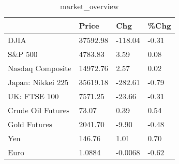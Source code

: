 \documentclass{article}%
\begin{document}
%


\begin{table}[htbp]%
\caption{market\_overview}%
\centering%
\begin{adjustbox}{width=1\textwidth}%
\begin{tabular}{llll}
\toprule
                  &    Price &     Chg &  \%Chg \\
\midrule
             DJIA & 37592.98 & -118.04 & -0.31 \\
          S\&P 500 &  4783.83 &    3.59 &  0.08 \\
 Nasdaq Composite & 14972.76 &    2.57 &  0.02 \\
Japan: Nikkei 225 & 35619.18 & -282.61 & -0.79 \\
     UK: FTSE 100 &  7571.25 &  -23.66 & -0.31 \\
Crude Oil Futures &    73.07 &    0.39 &  0.54 \\
     Gold Futures &  2041.70 &   -9.90 & -0.48 \\
              Yen &   146.76 &    1.01 &  0.70 \\
             Euro &   1.0884 & -0.0068 & -0.62 \\
\bottomrule
\end{tabular}
%
\end{adjustbox}%
\end{table}

%
\end{document}
